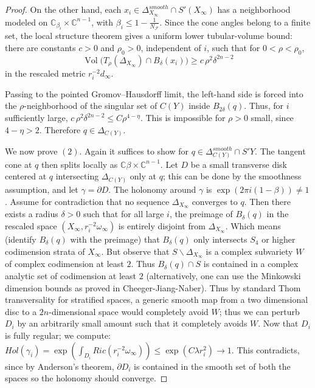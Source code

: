 \documentclass[11pt]{amsart}
\theoremstyle{definition}
\theoremstyle{remark}
\begin{document}
\begin{proof}
On the other hand, each $x_i\in \Delta_{X_\infty}^{smooth}\cap S'(X_\infty)$
has a neighborhood modeled on
$\mathbb C_{\beta_i}\times\mathbb C^{n-1}$, with
$\beta_i\leq 1-\frac1{N_{\mathcal F}}$. Since the cone angles belong to a finite
set, the local structure theorem gives a uniform lower tubular-volume bound:
there are constants $c>0$ and $\rho_0>0$, independent of $i$, such that for
$0<\rho<\rho_0$,
\[
        \operatorname{Vol}\bigl(T_\rho(\Delta_{X_\infty})\cap
        B_\delta(x_i)\bigr)
        \geq c\,\rho^2\delta^{2n-2}
\]
in the rescaled metric $r_i^{-2}d_\infty$.

Passing to the pointed Gromov--Hausdorff limit, the left-hand side is forced
into the $\rho$-neighborhood of the singular set of $C(Y)$ inside
$B_{2\delta}(q)$. Thus, for $i$ sufficiently large,
$c\,\rho^2\delta^{2n-2}\leq C\rho^{4-\eta}$. This is impossible for $\rho>0$
small, since $4-\eta>2$. Therefore $q\in\Delta_{C(Y)}$.

We now prove $(2)$. Again it suffices to show for $ q \in \Delta_{C(Y)}^{smooth} \cap S'Y$. The tangent cone at $q$ then splits locally as $\mathbb{C}\beta \times \mathbb{C}^{n-1}$. Let $D$ be a small transverse disk centered at $q$ intersecting $\Delta_{C(Y)}$ only at $q$; this can be done by the smoothness assumption, and let $\gamma = \partial D$.  The holonomy around $\gamma$ is $\exp(2 \pi i (1 - \beta)) \neq 1$. Assume for contradiction that no sequence $\Delta_{X_\infty}$ converges to $q$. Then there exists a radius $\delta > 0$ such that for all large $i$, the preimage of $B_\delta(q)$ in the rescaled space $(X_\infty, r_i^{-2} \omega_\infty)$ is entirely disjoint from $\Delta_{X_\infty}$. Which means (identify $B_\delta(q)$ with the preimage) that $B_\delta(q)$ only intersects $S_4$ or higher codimension strata of $X_\infty$. But observe that $S \backslash \Delta_{X_\infty}$ is a complex subvariety $W$ of complex codimension at least $2$. Thus $B_\delta(q) \cap S$ is contained in a complex analytic set of codimension at least $2$ (alternatively, one can use the Minkowski dimension bounds as proved in Cheeger-Jiang-Naber). Thus by standard Thom transversality for stratified spaces, a generic smooth map from a two dimensional disc to a $2n$-dimensional space would completely avoid $W$; thus we can perturb $D_i$ by an arbitrarily small amount such that it completely avoids $W$. Now that $D_i$ is fully regular; we compute: $Hol(\gamma_i) = \exp(\int_{D_i} Ric(r_i^{-2} \omega_\infty)) \leq \exp(C \lambda r_i^2) \rightarrow 1$. This contradicts, since by Anderson's theorem, $\partial D_i$ is contained in the smooth set of both the spaces so the holonomy should converge.
\end{proof}
\end{document}
